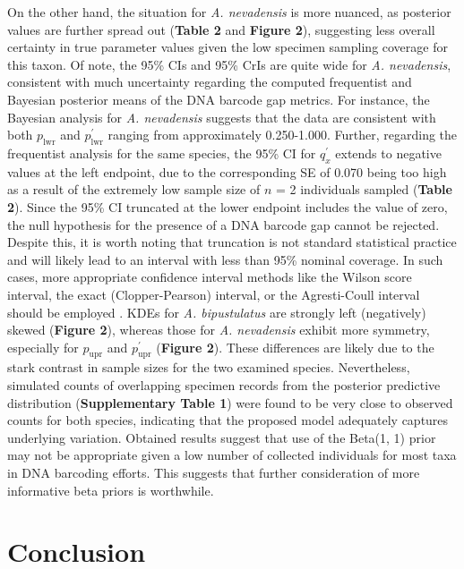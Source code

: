 \documentclass[12pt]{article}
\begin{document}
\noindent On the other hand, the situation for \textit{A. nevadensis} is more nuanced, as posterior values are further spread out (\textbf{Table 2} and \textbf{Figure 2}), suggesting less overall certainty in true parameter values given the low specimen sampling coverage for this taxon. Of note, the 95\% CIs and 95\% CrIs are quite wide for \textit{A. nevadensis}, consistent with much uncertainty regarding the computed frequentist and Bayesian posterior means of the DNA barcode gap metrics. For instance, the Bayesian analysis for \textit{A. nevadensis} suggests that the data are consistent with both $p_{\mathrm{lwr}}$ and $p^{'}_{\mathrm{lwr}}$ ranging from approximately 0.250-1.000. Further, regarding the frequentist analysis for the same species, the 95\% CI for $q^{'}_x$ extends to negative values at the left endpoint, due to the corresponding SE of 0.070 being too high as a result of the extremely low sample size of $n$ = 2 individuals sampled (\textbf{Table 2}). Since the 95\% CI truncated at the lower endpoint includes the value of zero, the null hypothesis for the presence of a DNA barcode gap cannot be rejected. Despite this, it is worth noting that truncation is not standard statistical practice and will likely lead to an interval with less than 95\% nominal coverage. In such cases, more appropriate confidence interval methods like the Wilson score interval, the exact (Clopper-Pearson) interval, or the Agresti-Coull interval should be employed \citep{newcombe1998confidence, agresti1998approximate}. KDEs for \textit{A. bipustulatus} are strongly left (negatively) skewed (\textbf{Figure 2}), whereas those for \textit{A. nevadensis} exhibit more symmetry, especially for $p_{\mathrm{upr}}$ and $p^{'}_{\mathrm{upr}}$ (\textbf{Figure 2}). These differences are likely due to the stark contrast in sample sizes for the two examined species. Nevertheless, simulated counts of overlapping specimen records from the posterior predictive distribution (\textbf{Supplementary Table 1}) were found to be very close to observed counts for both species, indicating that the proposed model adequately captures underlying variation. Obtained results suggest that use of the Beta(1, 1) prior may not be appropriate given a low number of collected individuals for most taxa in DNA barcoding efforts. This suggests that further consideration of more informative beta priors is worthwhile. 

\section{Conclusion}
\end{document}
